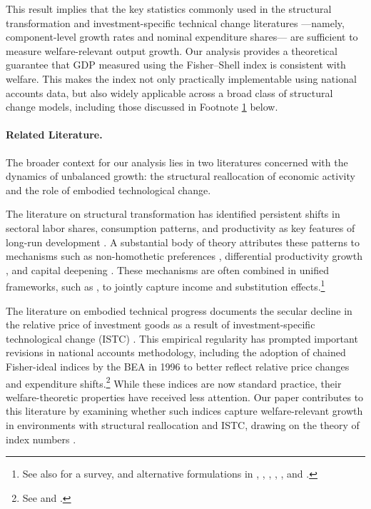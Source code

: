 \documentclass[12pt,a4paper]{article}
\begin{document}
This result implies that the key statistics commonly used in the structural transformation and investment-specific technical change literatures —namely, component-level growth rates and nominal expenditure shares— are sufficient to measure welfare-relevant output growth. Our analysis provides a theoretical guarantee that GDP measured using the Fisher–Shell index is consistent with welfare. This makes the index not only practically implementable using national accounts data, but also widely applicable across a broad class of structural change models, including those discussed in Footnote \ref{foot:ref2} below.

\paragraph{Related Literature.} The broader context for our analysis lies in two literatures concerned with the dynamics of unbalanced growth: the structural reallocation of economic activity and the role of embodied technological change.

The literature on structural transformation has identified persistent shifts in sectoral labor shares, consumption patterns, and productivity as key features of long-run development \citep{kuznets1966growth, duarte2010structural}. A substantial body of theory attributes these patterns to mechanisms such as non-homothetic preferences \citep{kongsamut2001transitional}, differential productivity growth \citep{ngai2007structural}, and capital deepening \citep{acemoglu2008capital}. These mechanisms are often combined in unified frameworks, such as \citet{herrendorf2013two}, to jointly capture income and substitution effects.\footnote{See also \citet{herrendorf2014growth} for a survey, and alternative formulations in \citet{buera2009can}, \citet{Boppart_2014}, \citet{alvarez2017capital}, \citet{swiecki2017determinants}, \citet{comin2021structural}, and \citet{alder2022theory}.\label{foot:ref2}}

The literature on embodied technical progress documents the secular decline in the relative price of investment goods as a result of investment-specific technological change (ISTC) \citep{gordon1990, greenwood1997long, Boucekkine_DelRio_Licandro}. This empirical regularity has prompted important revisions in national accounts methodology, including the adoption of chained Fisher-ideal indices by the BEA in 1996 to better reflect relative price changes and expenditure shifts.\footnote{See \citet{parker_triplett_1996} and \citet{whelan2002computers}.} While these indices are now standard practice, their welfare-theoretic properties have received less attention. Our paper contributes to this literature by examining whether such indices capture welfare-relevant growth in environments with structural reallocation and ISTC, drawing on the theory of index numbers \citep{fisher1922making, fisher_shell_1968, diewert1976exact, diewert1978superlative, caves1982economic}.
\end{document}
